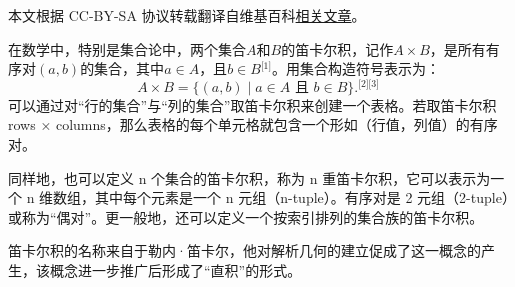 
本文根据 CC-BY-SA 协议转载翻译自维基百科\href{https://en.wikipedia.org/wiki/Cartesian_product}{相关文章}。

在数学中，特别是集合论中，两个集合\(A\)和\(B\)的笛卡尔积，记作\( A \times B \)，是所有有序对\( (a, b) \)的集合，其中\( a \in A \)，且\( b \in B \)\(^\text{[1]}\)。用集合构造符号表示为：  
\[
A \times B = \{ (a, b) \mid a \in A \text{ 且 } b \in B \}.^\text{[2][3]}~
\]
可以通过对“行的集合”与“列的集合”取笛卡尔积来创建一个表格。若取笛卡尔积 rows × columns，那么表格的每个单元格就包含一个形如（行值，列值）的有序对。

同样地，也可以定义 n 个集合的笛卡尔积，称为 n 重笛卡尔积，它可以表示为一个 n 维数组，其中每个元素是一个 n 元组（n-tuple）。有序对是 2 元组（2-tuple）或称为“偶对”。更一般地，还可以定义一个按索引排列的集合族的笛卡尔积。

笛卡尔积的名称来自于勒内·笛卡尔，他对解析几何的建立促成了这一概念的产生，该概念进一步推广后形成了“直积”的形式。